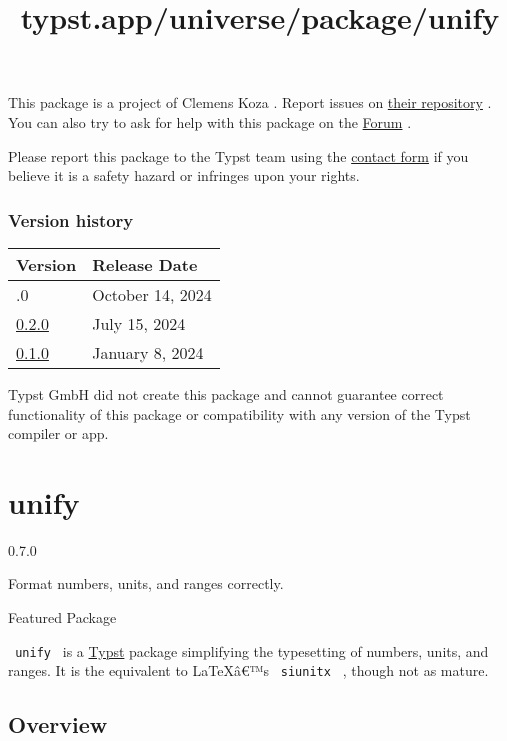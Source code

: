 This package is a project of Clemens Koza . Report issues on
\href{https://github.com/SillyFreak/typst-scrutinize}{their repository}
. You can also try to ask for help with this package on the
\href{https://forum.typst.app}{Forum} .

Please report this package to the Typst team using the
\href{https://typst.app/contact}{contact form} if you believe it is a
safety hazard or infringes upon your rights.

\label{versions}
\subsubsection{Version history}\label{version-history}

\begin{longtable}[]{@{}ll@{}}
\toprule\noalign{}
Version & Release Date \\
\midrule\noalign{}
\endhead
\bottomrule\noalign{}
\endlastfoot
0.3.0 & October 14, 2024 \\
\href{https://typst.app/universe/package/scrutinize/0.2.0/}{0.2.0} &
July 15, 2024 \\
\href{https://typst.app/universe/package/scrutinize/0.1.0/}{0.1.0} &
January 8, 2024 \\
\end{longtable}

Typst GmbH did not create this package and cannot guarantee correct
functionality of this package or compatibility with any version of the
Typst compiler or app.


\title{typst.app/universe/package/unify}

\label{banner}
\section{unify}\label{unify}

{ 0.7.0 }

Format numbers, units, and ranges correctly.

{ } Featured Package

\label{readme}
\texttt{\ unify\ } is a \href{https://github.com/typst/typst}{Typst}
package simplifying the typesetting of numbers, units, and ranges. It is
the equivalent to LaTeXâ€™s \texttt{\ siunitx\ } , though not as mature.

\subsection{Overview}\label{overview}

